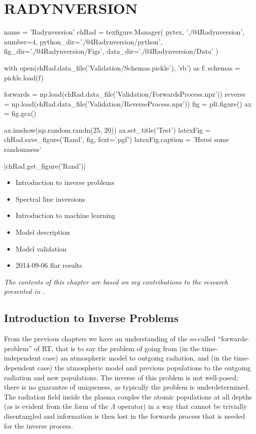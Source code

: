 \chapter{RADYNVERSION}\label{Chap:Radynversion}

\begin{pycode}[Radynversion]
name = 'Radynversion'
chRad = texfigure.Manager(
    pytex,
    './04Radynversion',
    number=4,
    python_dir='./04Radynversion/python',
    fig_dir='./04Radynversion/Figs',
    data_dir='./04Radynversion/Data'
)
\end{pycode}

\begin{pycode}[Radynversion]
with open(chRad.data_file('Validation/Schemas.pickle'), 'rb') as f:
    schemas = pickle.load(f)

forwards = np.load(chRad.data_file('Validation/ForwardsProcess.npz'))
reverse = np.load(chRad.data_file('Validation/ReverseProcess.npz'))
fig = plt.figure()
ax = fig.gca()

ax.imshow(np.random.randn(25, 20))
ax.set_title('Test')
latexFig = chRad.save_figure('Rand', fig, fext='.pgf')
latexFig.caption = 'Here\'s some randomness'
\end{pycode}

\py[Radynversion]|chRad.get_figure('Rand')|

\begin{itemize}
    \item Introduction to inverse problems
    \item Spectral line inversions
    \item Introduction to machine learning
    \item Model description
    \item Model validation
    \item 2014-09-06 flar results
\end{itemize}

\emph{The contents of this chapter are based on my contributions to the research presented in \citet{Osborne2019}.}



\section{Introduction to Inverse Problems}

From the previous chapters we have an understanding of the so-called ``forwards-problem'' of RT, that is to say the problem of going from (in the time-independent case) an atmospheric model to outgoing radiation, and (in the time-dependent case) the atmospheric model and previous populations to the outgoing radiation and new populations.
The inverse of this problem is not well-posed; there is no guarantee of uniqueness, as typically the problem is underdetermined.
The radiation field inside the plasma couples the atomic populations at all depths (as is evident from the form of the $\Lambda$ operator) in a way that cannot be trivially disentangled and information is then lost in the forwards process that is needed for the inverse process.

